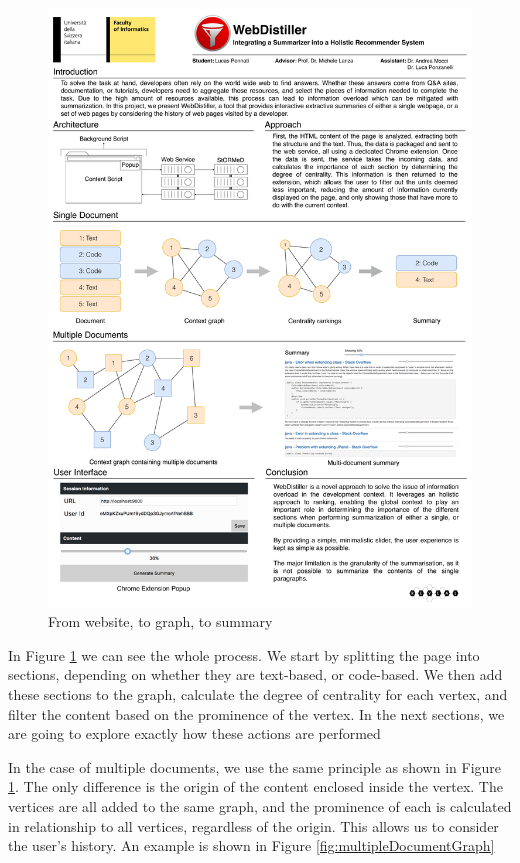 \begin{figure}[H]
\centering
\includegraphics[scale=0.2]{Figures/graphs}
\caption{From website, to graph, to summary}
\label{fig:graph}
\end{figure} 
In Figure \ref{fig:graph} we can see the whole process. We start by splitting the page into sections, depending on whether they are text-based, or code-based. We then add these sections to the graph, calculate the degree of centrality for each vertex, and filter the content based on the prominence of the vertex. In the next sections, we are going to explore exactly how these actions are performed

In the case of multiple documents, we use the same principle as shown in Figure \ref{fig:graph}. The only difference is the origin of the content enclosed inside the vertex. The vertices are all added to the same graph, and the prominence of each is calculated in relationship to all vertices, regardless of the origin. This allows us to consider the user's history. An example is shown in Figure \ref{fig:multipleDocumentGraph}

